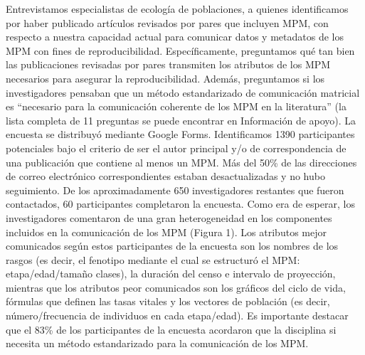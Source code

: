 \documentclass[
  12pt,
  letterpaper,
]{book}
\begin{document}
Entrevistamos especialistas de ecología de poblaciones, a quienes
identificamos por haber publicado artículos revisados por pares que
incluyen MPM, con respecto a nuestra capacidad actual para comunicar
datos y metadatos de los MPM con fines de reproducibilidad.
Específicamente, preguntamos qué tan bien las publicaciones revisadas
por pares transmiten los atributos de los MPM necesarios para asegurar
la reproducibilidad. Además, preguntamos si los investigadores pensaban
que un método estandarizado de comunicación matricial es ``necesario
para la comunicación coherente de los MPM en la literatura'' (la lista
completa de 11 preguntas se puede encontrar en Información de apoyo). La
encuesta se distribuyó mediante Google Forms. Identificamos 1390
participantes potenciales bajo el criterio de ser el autor principal y/o
de correspondencia de una publicación que contiene al menos un MPM. Más
del 50\% de las direcciones de correo electrónico correspondientes
estaban desactualizadas y no hubo seguimiento. De los aproximadamente
650 investigadores restantes que fueron contactados, 60 participantes
completaron la encuesta. Como era de esperar, los investigadores
comentaron de una gran heterogeneidad en los componentes incluidos en la
comunicación de los MPM (Figura 1). Los atributos mejor comunicados
según estos participantes de la encuesta son los nombres de los rasgos
(es decir, el fenotipo mediante el cual se estructuró el MPM:
etapa/edad/tamaño clases), la duración del censo e intervalo de
proyección, mientras que los atributos peor comunicados son los gráficos
del ciclo de vida, fórmulas que definen las tasas vitales y los vectores
de población (es decir, número/frecuencia de individuos en cada
etapa/edad). Es importante destacar que el 83\% de los participantes de
la encuesta acordaron que la disciplina si necesita un método
estandarizado para la comunicación de los MPM.
\end{document}
